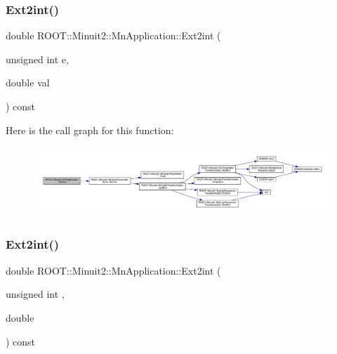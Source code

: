 \subsubsection{\texorpdfstring{Ext2int()}{Ext2int()}\hspace{0.1cm}{\footnotesize\ttfamily [1/2]}}
{\footnotesize\ttfamily double R\+O\+O\+T\+::\+Minuit2\+::\+Mn\+Application\+::\+Ext2int (\begin{DoxyParamCaption}\item[{unsigned int}]{e,  }\item[{double}]{val }\end{DoxyParamCaption}) const}

Here is the call graph for this function\+:\nopagebreak
\begin{figure}[H]
\begin{center}
\leavevmode
\includegraphics[width=350pt]{df/dd5/classROOT_1_1Minuit2_1_1MnApplication_a8c9379939f201ea95f32a2f1de575fca_cgraph}
\end{center}
\end{figure}
\mbox{\label{classROOT_1_1Minuit2_1_1MnApplication_a8c9379939f201ea95f32a2f1de575fca}} 
\subsubsection{\texorpdfstring{Ext2int()}{Ext2int()}\hspace{0.1cm}{\footnotesize\ttfamily [2/2]}}
{\footnotesize\ttfamily double R\+O\+O\+T\+::\+Minuit2\+::\+Mn\+Application\+::\+Ext2int (\begin{DoxyParamCaption}\item[{unsigned int}]{,  }\item[{double}]{ }\end{DoxyParamCaption}) const}

\mbox{\label{classROOT_1_1Minuit2_1_1MnApplication_a61dc63d2a6320aae96867ad57918c496}} 
